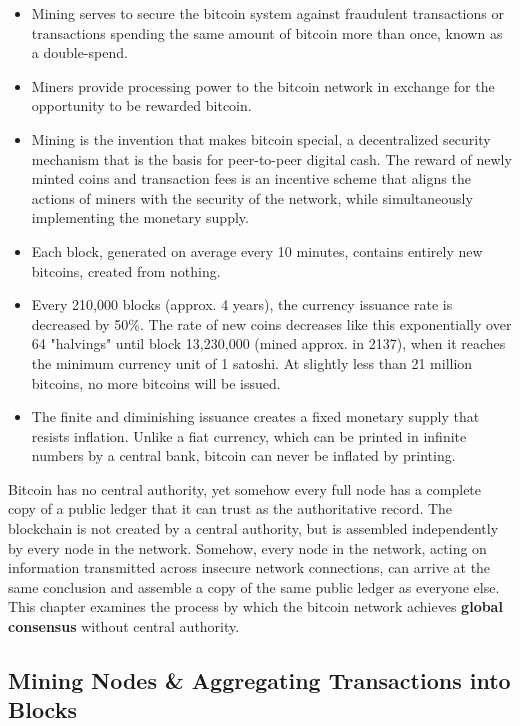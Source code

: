 \documentclass{article}
\begin{document}
    \begin{itemize}
      \item Mining serves to secure the bitcoin system against fraudulent transactions or transactions spending the same amount of bitcoin more than once, known as a double-spend.
      \item Miners provide processing power to the bitcoin network in exchange for the opportunity to be rewarded bitcoin.
      \item Mining is the invention that makes bitcoin special, a decentralized security mechanism that is the basis for peer-to-peer digital cash. The reward of newly minted coins and transaction fees is an incentive scheme that aligns the actions of miners with the security of the network, while simultaneously implementing the monetary supply.
      \item Each block, generated on average every 10 minutes, contains entirely new bitcoins, created from nothing.
      \item Every 210,000 blocks (approx. 4 years), the currency issuance rate is decreased by 50\%. The rate of new coins decreases like this exponentially over 64 "halvings" until block 13,230,000 (mined approx. in 2137), when it reaches the minimum currency unit of 1 satoshi. At slightly less than 21 million bitcoins, no more bitcoins will be issued.
      \item The finite and diminishing issuance creates a fixed monetary supply that resists inflation. Unlike a fiat currency, which can be printed in infinite numbers by a central bank, bitcoin can never be inflated by printing.
    \end{itemize}

    Bitcoin has no central authority, yet somehow every full node has a complete copy of a public ledger that it can trust as the authoritative record. The blockchain is not created by a central authority, but is assembled independently by every node in the network. Somehow, every node in the network, acting on information transmitted across insecure network connections, can arrive at the same conclusion and assemble a copy of the same public ledger as everyone else. This chapter examines the process by which the bitcoin network achieves \textbf{global consensus} without central authority.

  \subsection{Mining Nodes \& Aggregating Transactions into Blocks}
\end{document}
